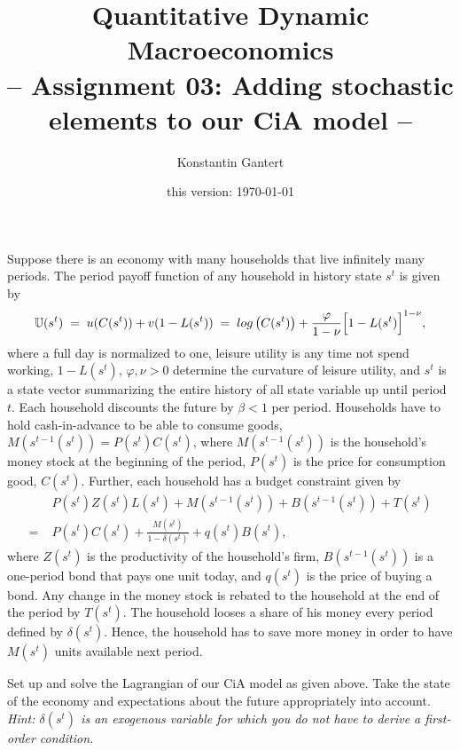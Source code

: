 \documentclass[a4paper, 12pt]{article}
\title{Quantitative Dynamic Macroeconomics \vspace{0.1in} \\ \large{-- Assignment 03: Adding stochastic elements to our CiA model --}}
\author{\small{Konstantin Gantert}}
\date{\small{this version: \today}}
\begin{document}
%
\clearpage\maketitle%
Suppose there is an economy with many households that live infinitely many periods. The period payoff function of any household in history state $s^t$ is given by%
\begin{align*}%
	\mathbb{U}(s^t) \; = \; u(C(s^t)) + v(1-L(s^t)) \; = \; log \left(C(s^t)\right) + \frac{\varphi}{1-\nu} \Bigl[ 1-L(s^t) \Bigr]^{1-\nu},%
\end{align*}%
where a full day is normalized to one, leisure utility is any time not spend working, $1-L(s^t)$, $\varphi, \nu>0$ determine the curvature of leisure utility, and $s^t$ is a state vector summarizing the entire history of all state variable up until period $t$. Each household discounts the future by $\beta<1$ per period. Households have to hold cash-in-advance to be able to consume goods, $M(s^{t-1}(s^t)) = P(s^t) C(s^t)$, where $M(s^{t-1}(s^t))$ is the household's money stock at the beginning of the period, $P(s^t)$ is the price for consumption good, $C(s^t)$. Further, each household has a budget constraint given by%
\begin{align*}%
	& P(s^t) Z(s^t) L(s^t) + M(s^{t-1}(s^t)) + B(s^{t-1}(s^t)) + T(s^t)\\
	= \; & P(s^t) C(s^t) + \frac{M(s^t)}{1-\delta(s^t)} + q(s^t) B(s^t),
\end{align*}%
where $Z(s^t)$ is the productivity of the household's firm, $B(s^{t-1}(s^t))$ is a one-period bond that pays one unit today, and $q(s^t)$ is the price of buying a bond. Any change in the money stock is rebated to the household at the end of the period by $T(s^t)$. The household looses a share of his money every period defined by $\delta(s^t)$. Hence, the household has to save more money in order to have $M(s^t)$ units available next period.%
\begin{Exercise}[title={Lagrangian and FOCs of the stochastic model},label=ex_1]%
	Set up and solve the Lagrangian of our CiA model as given above. Take the state of the economy and expectations about the future appropriately into account. \textit{Hint: $\delta (s^t)$ is an exogenous variable for which you do not have to derive a first-order condition.}%
\end{Exercise}%
\end{document}
